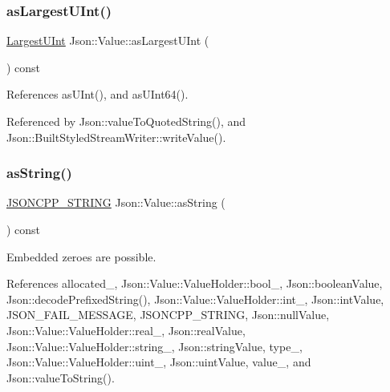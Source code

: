 \subsubsection{\texorpdfstring{as\+Largest\+U\+Int()}{asLargestUInt()}}
{\footnotesize\ttfamily \hyperlink{classJson_1_1Value_a6682a3684d635e03fc06ba229fa24eec_a6682a3684d635e03fc06ba229fa24eec}{Largest\+U\+Int} Json\+::\+Value\+::as\+Largest\+U\+Int (\begin{DoxyParamCaption}{ }\end{DoxyParamCaption}) const}



References as\+U\+Int(), and as\+U\+Int64().



Referenced by Json\+::value\+To\+Quoted\+String(), and Json\+::\+Built\+Styled\+Stream\+Writer\+::write\+Value().

\mbox{\label{classJson_1_1Value_ae3f9b0d38f820ccdd8888aa92ea6e792_ae3f9b0d38f820ccdd8888aa92ea6e792}} 
\subsubsection{\texorpdfstring{as\+String()}{asString()}}
{\footnotesize\ttfamily \hyperlink{json_8h_a1e723f95759de062585bc4a8fd3fa4be_a1e723f95759de062585bc4a8fd3fa4be}{J\+S\+O\+N\+C\+P\+P\+\_\+\+S\+T\+R\+I\+NG} Json\+::\+Value\+::as\+String (\begin{DoxyParamCaption}{ }\end{DoxyParamCaption}) const}



Embedded zeroes are possible. 



References allocated\+\_\+, Json\+::\+Value\+::\+Value\+Holder\+::bool\+\_\+, Json\+::boolean\+Value, Json\+::decode\+Prefixed\+String(), Json\+::\+Value\+::\+Value\+Holder\+::int\+\_\+, Json\+::int\+Value, J\+S\+O\+N\+\_\+\+F\+A\+I\+L\+\_\+\+M\+E\+S\+S\+A\+GE, J\+S\+O\+N\+C\+P\+P\+\_\+\+S\+T\+R\+I\+NG, Json\+::null\+Value, Json\+::\+Value\+::\+Value\+Holder\+::real\+\_\+, Json\+::real\+Value, Json\+::\+Value\+::\+Value\+Holder\+::string\+\_\+, Json\+::string\+Value, type\+\_\+, Json\+::\+Value\+::\+Value\+Holder\+::uint\+\_\+, Json\+::uint\+Value, value\+\_\+, and Json\+::value\+To\+String().



